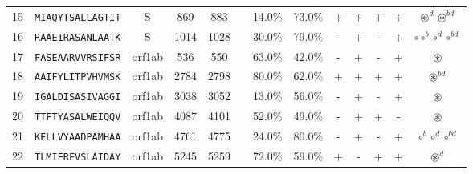 \begin{tabular}{rcccccccccccc}
15 &  \texttt{MIAQYTSALLAGTIT} &       S &    869 &   883 &                &                          14.0\% &                           73.0\% &          + &           + &          + &           + &                                                                                      $ \circledast^d \circledast^{bd} $ \\
16 &  \texttt{RAAEIRASANLAATK} &       S &   1014 &  1028 &                &                          30.0\% &                           79.0\% &          - &           + &          - &           + &                                                                                    $ \circ \circ^b \circ^d \circ^{bd} $ \\
17 &  \texttt{FASEAARVVRSIFSR} &  orf1ab &    536 &   550 &                &                          63.0\% &                           42.0\% &          - &           + &          - &           + &                                                                                                         $ \circledast $ \\
18 &  \texttt{AAIFYLITPVHVMSK} &  orf1ab &   2784 &  2798 &                &                          80.0\% &                           62.0\% &          + &           + &          + &           + &                                                                                                    $ \circledast^{bd} $ \\
19 &  \texttt{IGALDISASIVAGGI} &  orf1ab &   3038 &  3052 &                &                          13.0\% &                           56.0\% &          - &           + &          - &           + &                                                                                                         $ \circledast $ \\
20 &  \texttt{TTFTYASALWEIQQV} &  orf1ab &   4087 &  4101 &                &                          52.0\% &                           49.0\% &          - &           + &          + &           - &                                                                                                         $ \circledast $ \\
21 &  \texttt{KELLVYAADPAMHAA} &  orf1ab &   4761 &  4775 &                &                          24.0\% &                           80.0\% &          - &           + &          - &           + &                                                                                          $ \circ^b \circ^d \circ^{bd} $ \\
22 &  \texttt{TLMIERFVSLAIDAY} &  orf1ab &   5245 &  5259 &                &                          72.0\% &                           59.0\% &          + &           - &          + &           + &                                                                                                       $ \circledast^d $ \\

\end{tabular}
